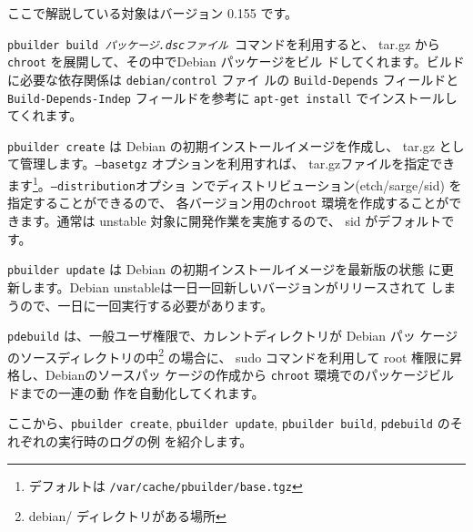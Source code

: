\documentclass[mingoth,a4paper]{jsarticle}
\begin{document}
ここで解説している対象はバージョン 0.155 です。

{\tt pbuilder build {\it パッケージ.dscファイル} }コマンドを利用すると、
tar.gz から \texttt{chroot} を展開して、その中でDebian パッケージをビル
ドしてくれます。ビルドに必要な依存関係は \texttt{debian/control} ファイ
ルの \texttt{Build-Depends} フィールドと \texttt{Build-Depends-Indep} 
フィールドを参考に \texttt{apt-get install} でインストールしてくれます。

{\tt pbuilder create} は Debian の初期インストールイメージを作成し、 
tar.gz として管理します。\texttt{--basetgz} オプションを利用すれば、
tar.gzファイルを指定できます\footnote{デフォルトは 
\texttt{/var/cache/pbuilder/base.tgz}}。\texttt{--distribution}オプショ
ンでディストリビューション(etch/sarge/sid) を指定することができるので、
各バージョン用の\texttt{chroot} 環境を作成することができます。通常は
unstable 対象に開発作業を実施するので、 sid がデフォルトです。

{\tt pbuilder update} は Debian の初期インストールイメージを最新版の状態
に更新します。Debian unstableは一日一回新しいバージョンがリリースされて
しまうので、一日に一回実行する必要があります。

{\tt pdebuild} は、一般ユーザ権限で、カレントディレクトリが Debian パッ
ケージのソースディレクトリの中\footnote{debian/ ディレクトリがある場所}
の場合に、 sudo コマンドを利用して root 権限に昇格し、Debianのソースパッ
ケージの作成から \texttt{chroot} 環境でのパッケージビルドまでの一連の動
作を自動化してくれます。

ここから、\texttt{pbuilder create}, \texttt{pbuilder update},
\texttt{pbuilder build}, \texttt{pdebuild} のそれぞれの実行時のログの例
を紹介します。
\end{document}
